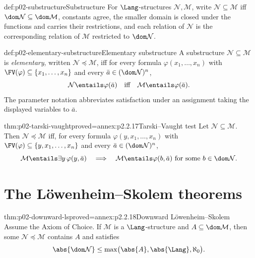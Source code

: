 \begin{hbdefinition}{def:p02-substructure}{Substructure}
For \(\Lang\)-structures \(\mathcal N,\mathcal M\), write
\(\mathcal N\subseteq\mathcal M\) iff
\(\dom\mathcal N\subseteq\dom\mathcal M\), constants agree, the smaller
domain is closed under the functions and carries their restrictions, and
each relation of \(\mathcal N\) is the corresponding relation of
\(\mathcal M\) restricted to \(\dom\mathcal N\).
\end{hbdefinition}

\begin{hbdefinition}{def:p02-elementary-substructure}{Elementary substructure}
A substructure \(\mathcal N\subseteq\mathcal M\) is
\emph{elementary}, written \(\mathcal N\preccurlyeq\mathcal M\), iff for
every formula \(\varphi(x_1,\ldots,x_n)\) with
\(\FV(\varphi)\subseteq\{x_1,\ldots,x_n\}\) and every
\(\bar a\in(\dom\mathcal N)^n\),
\[
 \mathcal N\entails\varphi(\bar a)
 \quad\text{iff}\quad
 \mathcal M\entails\varphi(\bar a).
\]
The parameter notation abbreviates satisfaction under an assignment taking
the displayed variables to \(\bar a\).
\end{hbdefinition}

\begin{hbtheorem}{thm:p02-tarski-vaught}{proved=annex:p2.2.17}{Tarski--Vaught test}
Let \(\mathcal N\subseteq\mathcal M\).  Then
\(\mathcal N\preccurlyeq\mathcal M\) iff, for every formula
\(\varphi(y,x_1,\ldots,x_n)\) with
\(\FV(\varphi)\subseteq\{y,x_1,\ldots,x_n\}\) and every
\(\bar a\in(\dom\mathcal N)^n\),
\[
 \mathcal M\entails\exists y\,\varphi(y,\bar a)
 \quad\Longrightarrow\quad
 \mathcal M\entails\varphi(b,\bar a)
 \text{ for some }b\in\dom\mathcal N.
\]
\end{hbtheorem}

\section{The L\"owenheim--Skolem theorems}
\label{sec:p02-first-order-lowenheim-skolem}

\begin{hbtheorem}{thm:p02-downward-ls}{proved=annex:p2.2.18}{Downward L\"owenheim--Skolem}
Assume the Axiom of Choice.  If \(\mathcal M\) is a \(\Lang\)-structure
and \(A\subseteq\dom\mathcal M\), then some
\(\mathcal N\preccurlyeq\mathcal M\) contains \(A\) and satisfies
\[
 \abs{\dom\mathcal N}
 \leq\max\bigl(\abs{A},\abs{\Lang},\aleph_0\bigr).
\]
\end{hbtheorem}

